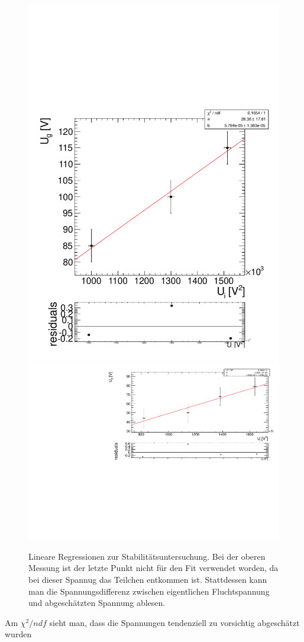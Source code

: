 \documentclass[a4paper,12pt]{article}
\begin{document}
\begin{figure}[htb]
		\includegraphics[height = 0.3\textheight]{../analyse/stabilitaet2.pdf}\\
		\includegraphics[height = 0.3\textheight]{../analyse/stabilitaet3.pdf}\\
		\caption{Lineare Regressionen zur Stabilitätsuntersuchung.
		Bei der oberen Messung ist der letzte Punkt nicht für den Fit verwendet worden, da bei dieser Spannug das Teilchen entkommen ist.
		Stattdessen kann man die Spannungsdifferenz zwischen eigentlichen Fluchtspannung und abgeschätzten Spannung ablesen.}
\end{figure}
Am $χ^2/ndf$ sieht man, dass die Spannungen tendenziell zu vorsichtig abgeschätzt wurden
\end{document}
